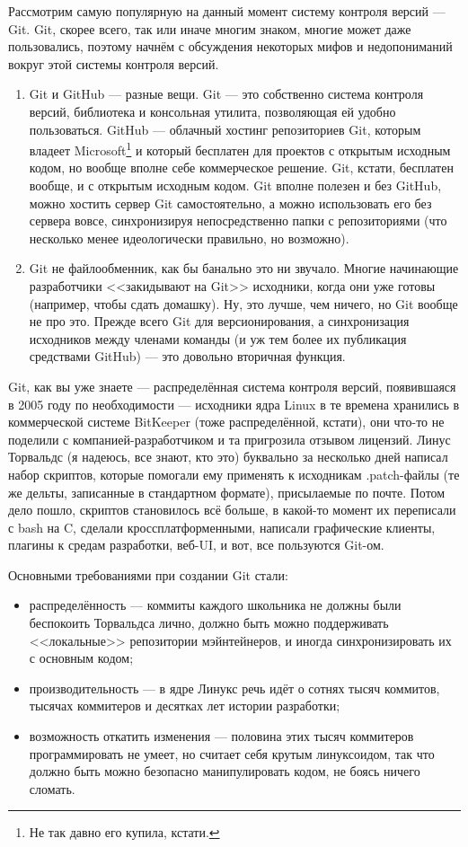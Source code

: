 \documentclass{../text-style}
\begin{document}
Рассмотрим самую популярную на данный момент систему контроля версий --- Git. Git, скорее всего, так или иначе многим знаком, многие может даже пользовались, поэтому начнём с обсуждения некоторых мифов и недопониманий вокруг этой системы контроля версий.

\begin{enumerate}
    \item Git и GitHub --- разные вещи. Git --- это собственно система контроля версий, библиотека и консольная утилита, позволяющая ей удобно пользоваться. GitHub --- облачный хостинг репозиториев Git, которым владеет Microsoft\footnote{Не так давно его купила, кстати.} и который бесплатен для проектов с открытым исходным кодом, но вообще вполне себе коммерческое решение. Git, кстати, бесплатен вообще, и с открытым исходным кодом. Git вполне полезен и без GitHub, можно хостить сервер Git самостоятельно, а можно использовать его без сервера вовсе, синхронизируя непосредственно папки с репозиториями (что несколько менее идеологически правильно, но возможно).
    \item Git не файлообменник, как бы банально это ни звучало. Многие начинающие разработчики <<закидывают на Git>> исходники, когда они уже готовы (например, чтобы сдать домашку). Ну, это лучше, чем ничего, но Git вообще не про это. Прежде всего Git для версионирования, а синхронизация исходников между членами команды (и уж тем более их публикация средствами GitHub) --- это довольно вторичная функция.
\end{enumerate}

Git, как вы уже знаете --- распределённая система контроля версий, появившаяся в 2005 году по необходимости --- исходники ядра Linux в те времена хранились в коммерческой системе BitKeeper (тоже распределённой, кстати), они что-то не поделили с компанией-разработчиком и та пригрозила отзывом лицензий. Линус Торвальдс (я надеюсь, все знают, кто это) буквально за несколько дней написал набор скриптов, которые помогали ему применять к исходникам .patch-файлы (те же дельты, записанные в стандартном формате), присылаемые по почте. Потом дело пошло, скриптов становилось всё больше, в какой-то момент их переписали с bash на C, сделали кроссплатформенными, написали графические клиенты, плагины к средам разработки, веб-UI, и вот, все пользуются Git-ом.

Основными требованиями при создании Git стали:

\begin{itemize}
    \item распределённость --- коммиты каждого школьника не должны были беспокоить Торвальдса лично, должно быть можно поддерживать <<локальные>> репозитории мэйнтейнеров, и иногда синхронизировать их с основным кодом;
    \item производительность --- в ядре Линукс речь идёт о сотнях тысяч коммитов, тысячах коммитеров и десятках лет истории разработки;
    \item возможность откатить изменения --- половина этих тысяч коммитеров программировать не умеет, но считает себя крутым линуксоидом, так что должно быть можно безопасно манипулировать кодом, не боясь ничего сломать.
\end{itemize}
\end{document}
